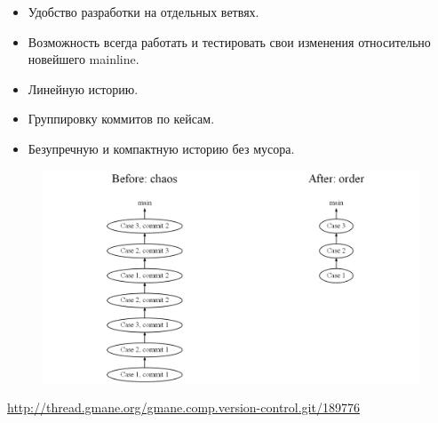 \documentclass[10pt, a5paper]{article}
\begin{document}
\begin{itemize}
  \item Удобство разработки на отдельных ветвях.
  \item Возможность всегда работать и тестировать свои изменения относительно новейшего mainline.
  \item Линейную историю.
  \item Группировку коммитов по кейсам.
  \item Безупречную и компактную историю без мусора.
\end{itemize}

\begin{figure}[h!]
  \centering
  \includegraphics[scale=0.2]{02_2014_before-vs-after.png}
\end{figure}

\begin{thebibliography}{9}
 \url{http://thread.gmane.org/gmane.comp.version-control.git/189776}
\end{thebibliography}
\end{document}
